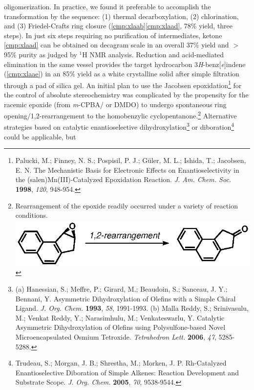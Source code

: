 oligomerization.
 In
practice, we found it preferable to accomplish the transformation by the sequence:
(1) thermal decarboxylation, (2) chlorination, and (3) Friedel-Crafts ring closure
(\ref{cmp:xlaab}\ce{->}\ref{cmp:xlaad}, 78\% yield, three steps).
In just six steps requiring no purification of intermediates, ketone \ref{cmp:xlaad} can be obtained
on decagram scale in an overall 37\% yield and $>$95\% purity as judged by $^1$H NMR analysis.
Reduction and acid-mediated elimination in the same vessel provides the target hydrocarbon
3\textit{H}-benz[\textit{e}]indene (\ref{cmp:xlaae})  in an 85\% yield
as a white crystalline solid after simple filtration through a pad of silica gel. An initial plan to
use the Jacobsen epoxidation\footnote{{\frenchspacing Palucki, M.; Finney, N. S.; Pospisil, P. J.;
G\"uler, M. L.; Ishida, T.; Jacobsen, E. N. The Mechanistic Basis for Electronic Effects on
Enantioselectivity in the (salen)Mn(III)-Catalyzed Epoxidation Reaction. \textit{J. Am. Chem. Soc.}
\textbf{1998}, \textit{120}, 948-954.}} for the control of absolute stereochemistry was complicated
by the propensity for the racemic epoxide (from \textit{m}-CPBA/ or DMDO) to undergo
spontaneous ring opening/1,2-rearrangement to the homobenzylic
cyclopentanone.\footnote{Rearrangement of the epoxide readily occurred under a variety of
reaction conditions.\\
\includegraphics[scale=0.7]{chp_asymmetric/images/naprearrangement} \label{ref:asepoxiderar}}
Alternative strategies based on catalytic enantioselective dihydroxylation\footnote{(a)
{\frenchspacing Hanessian, S.; Meffre, P.; Girard, M.; Beaudoin, S.; Sanceau, J. Y.; Bennani, Y.
Asymmetric Dihydroxylation of Olefins with a Simple Chiral Ligand. \textit{J. Org. Chem.}
\textbf{1993}, \textit{58}, 1991-1993.} (b) {\frenchspacing Malla Reddy, S.; Srinivasulu, M.; Venkat
Reddy, Y.; Narasimhulu, M.; Venkateswarlu, Y. Catalytic Asymmetric Dihydroxylation of Olefins using
Polysulfone-based Novel Microencapsulated Osmium Tetroxide. \textit{Tetrahedron Lett.} \textbf{2006}, \textit{47}, 5285-5288.}} or diboration\footnote{{\frenchspacing Trudeau, S.; Morgan, J. B.; Shrestha, M.; Morken, J. P.
Rh-Catalyzed Enantioselective Diboration of Simple Alkenes: Reaction Development and Substrate
Scope. \textit{J. Org. Chem.} \textbf{2005}, \textit{70}, 9538-9544.}} could be applicable, but
